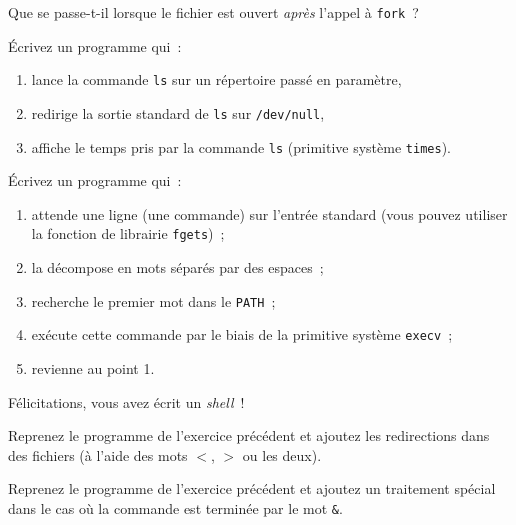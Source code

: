 Que se passe-t-il lorsque le fichier est ouvert {\em après} l'appel à
{\tt fork}~?


\question

Écrivez un programme qui~:

\begin {enumerate}
    \item lance la commande {\tt ls} sur un répertoire passé en
        paramètre,
    \item redirige la sortie standard de {\tt ls} sur {\tt /dev/null},
    \item affiche le temps pris par la commande {\tt ls} (primitive
	système {\tt times}).
\end {enumerate}


\question

Écrivez un programme qui~:

\begin {enumerate}
    \item attende une ligne (une commande) sur l'entrée standard (vous
	pouvez utiliser la fonction de librairie {\tt fgets})~;

    \item la décompose en mots séparés par des espaces~;

    \item recherche le premier mot dans le {\tt PATH}~;

    \item exécute cette commande par le biais de la primitive système
	{\tt execv}~;
    
    \item revienne au point 1.

\end {enumerate}

Félicitations, vous avez écrit un {\em shell}~!


\question

Reprenez le programme de l'exercice précédent et ajoutez les
redirections dans des fichiers (à l'aide des mots $<$, $>$ ou les
deux).


\question
\label{q:minishell}

Reprenez le programme de l'exercice précédent et ajoutez un traitement
spécial dans le cas où la commande est terminée par le mot \verb:&:.

